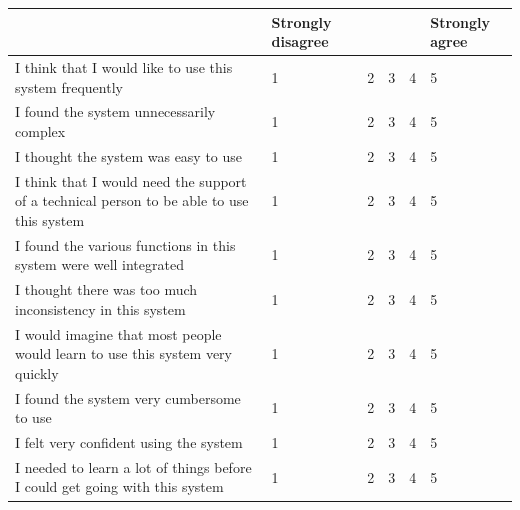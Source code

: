 \documentclass[a4paper,11pt]{article}
\begin{document}
\begin{appendices}
\begin{tabularx}{\textwidth}{p{2in} | Y Y Y Y Y }
	& Strongly disagree & & & & Strongly agree \\
	\hline
	I think that I would like to use this system frequently & 1 & 2 & 3 & 4 & 5 \\
	\hline
	I found the system unnecessarily complex & 1 & 2 & 3 & 4 & 5 \\
	\hline
	I thought the system was easy to use & 1 & 2 & 3 & 4 & 5 \\
	\hline
	I think that I would need the support of a technical person to be able to use this system & 1 & 2 & 3 & 4 & 5 \\
	\hline
	I found the various functions in this system were well integrated & 1 & 2 & 3 & 4 & 5 \\
	\hline
	I thought there was too much inconsistency in this system & 1 & 2 & 3 & 4 & 5 \\
	\hline
	I would imagine that most people would learn to use this system very quickly & 1 & 2 & 3 & 4 & 5 \\
	\hline
	I found the system very cumbersome to use & 1 & 2 & 3 & 4 & 5 \\
	\hline
	I felt very confident using the system & 1 & 2 & 3 & 4 & 5 \\
	\hline
	I needed to learn a lot of things before I could get going with this system & 1 & 2 & 3 & 4 & 5 \\
\end{tabularx}

\end{appendices}

\sloppy  %
\printbibliography[title={Bibliography}]
\end{document}

